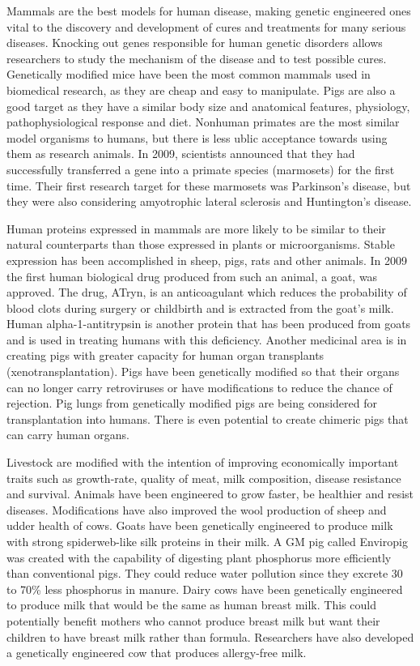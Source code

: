 Mammals are the best models for human disease, making genetic engineered ones vital to the discovery and development of cures and treatments for many serious diseases. Knocking out genes responsible for human genetic disorders allows researchers to study the mechanism of the disease and to test possible cures. Genetically modified mice have been the most common mammals used in biomedical research, as they are cheap and easy to manipulate. Pigs are also a good target as they have a similar body size and anatomical features, physiology, pathophysiological response and diet. Nonhuman primates are the most similar model organisms to humans, but there is less ublic acceptance towards using them as research animals. In 2009, scientists announced that they had successfully transferred a gene into a primate species (marmosets) for the first time. Their first research target for these marmosets was Parkinson's disease, but they were also considering amyotrophic lateral sclerosis and Huntington's disease.

Human proteins expressed in mammals are more likely to be similar to their natural counterparts than those expressed in plants or microorganisms. Stable expression has been accomplished in sheep, pigs, rats and other animals. In 2009 the first human biological drug produced from such an animal, a goat, was approved. The drug, ATryn, is an anticoagulant which reduces the probability of blood clots during surgery or childbirth and is extracted from the goat's milk. Human alpha-1-antitrypsin is another protein that has been produced from goats and is used in treating humans with this deficiency. Another medicinal area is in creating pigs with greater capacity for human organ transplants (xenotransplantation). Pigs have been genetically modified so that their organs can no longer carry retroviruses or have modifications to reduce the chance of rejection. Pig lungs from genetically modified pigs are being considered for transplantation into humans. There is even potential to create chimeric pigs that can carry human organs.

Livestock are modified with the intention of improving economically important traits such as growth-rate, quality of meat, milk composition, disease resistance and survival. Animals have been engineered to grow faster, be healthier and resist diseases. Modifications have also improved the wool production of sheep and udder health of cows. Goats have been genetically engineered to produce milk with strong spiderweb-like silk proteins in their milk. A GM pig called Enviropig was created with the capability of digesting plant phosphorus more efficiently than conventional pigs. They could reduce water pollution since they excrete 30 to 70\% less phosphorus in manure. Dairy cows have been genetically engineered to produce milk that would be the same as human breast milk. This could potentially benefit mothers who cannot produce breast milk but want their children to have breast milk rather than formula. Researchers have also developed a genetically engineered cow that produces allergy-free milk.

